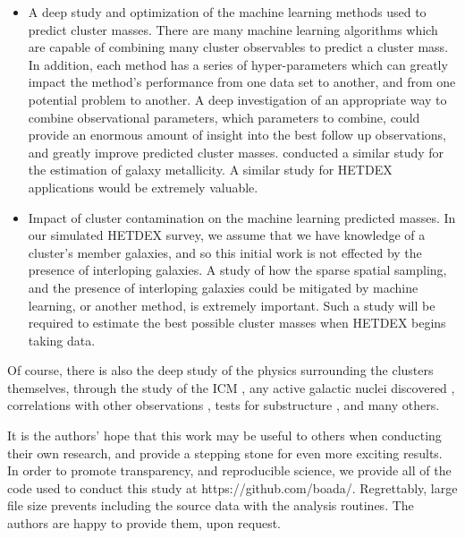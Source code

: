 \begin{itemize}
	\item A deep study and optimization of the machine learning methods used to predict cluster masses. There are many machine learning algorithms which are capable of combining many cluster observables to predict a cluster mass. In addition, each method has a series of hyper-parameters which can greatly impact the method's performance from one data set to another, and from one potential problem to another. A deep investigation of an appropriate way to combine observational parameters, which parameters to combine, could provide an enormous amount of insight into the best follow up observations, and greatly improve predicted cluster masses. \cite{Acquaviva2016} conducted a similar study for the estimation of galaxy metallicity. A similar study for HETDEX applications would be extremely valuable.
	\item Impact of cluster contamination on the machine learning predicted masses. In our simulated HETDEX survey, we assume that we have knowledge of a cluster's member galaxies, and so this initial work is not effected by the presence of interloping galaxies. A study of how the sparse spatial sampling, and the presence of interloping galaxies  could be mitigated by machine learning, or another method, is extremely important. Such a study will be required to estimate the best possible cluster masses when HETDEX begins taking data. 
\end{itemize} 

Of course, there is also the deep study of the physics surrounding the clusters themselves, through the study of the ICM , any active galactic nuclei discovered , correlations with other observations , tests for substructure , and many others. 

It is the authors' hope that this work may be useful to others when conducting their own research, and provide a stepping stone for even more exciting results. In order to promote transparency, and reproducible science, we provide all of the code used to conduct this study at https://github.com/boada/. Regrettably, large file size prevents including the source data with the analysis routines. The authors are happy to provide them, upon request.
